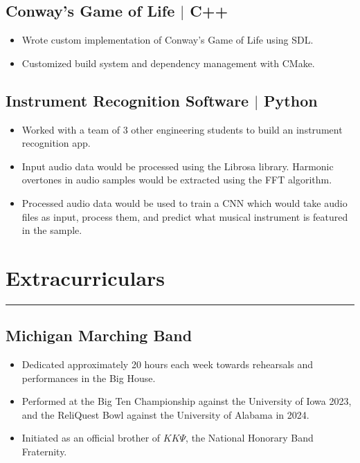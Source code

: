 \documentclass[10pt, letterpaper]{article}
\begin{document}
\subsection*{Conway's Game of Life $\vert$ C++}
\begin{itemize}[noitemsep]
	\item Wrote custom implementation of Conway's Game of Life using SDL.
	\item Customized build system and dependency management with CMake.
\end{itemize}

\subsection*{Instrument Recognition Software $\vert$ Python}
\begin{itemize}[noitemsep]
	\item Worked with a team of 3 other engineering students to build an instrument recognition app.
	\item Input audio data would be processed using the Librosa library. Harmonic overtones in audio samples would be extracted using the FFT algorithm.
	\item Processed audio data would be used to train a CNN which would take audio files as input, process them,
		and predict what musical instrument is featured in the sample.
\end{itemize}

\section*{Extracurriculars}
\hrule
\vspace{7pt}

\subsection*{Michigan Marching Band}
\begin{itemize}[noitemsep]
	\item Dedicated approximately 20 hours each week towards rehearsals and performances in the Big House.
	\item Performed at the Big Ten Championship against the University of Iowa 2023,
		and the ReliQuest Bowl against the University of Alabama in 2024.
	\item Initiated as an official brother of $K K\Psi$, the National Honorary Band Fraternity.
\end{itemize}
\end{document}
